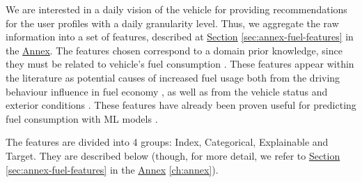 \begin{table}[h!]
\centering
{}
\caption{Sample of the received data from the telematics devices}
\label{table:ch6-sample-structure}
\end{table}

We are interested in a daily vision of the vehicle for providing recommendations for the user profiles with a daily granularity level. Thus, we aggregate the raw information into a set of features, described at \hyperref[sec:annex-fuel-features]{Section} \ref{sec:annex-fuel-features} in the \hyperref[ch:annex]{Annex}. The features chosen correspond to a domain prior knowledge, since they must be related to vehicle's fuel consumption \parencite{zacharof2016review}. These features appear within the literature as potential causes of increased fuel usage both from the driving behaviour influence in fuel economy \parencite{zhang2017safedrive}, as well as from the vehicle status and exterior conditions \parencite{zhou2016review}. These features have already been proven useful for predicting fuel consumption with ML models \parencite{9072728, 8727915, perrotta2017application, barbado2021understanding}.

The features are divided into 4 groups: Index, Categorical, Explainable and Target. They are described below (though, for more detail, we refer to \hyperref[sec:annex-fuel-features]{Section} \ref{sec:annex-fuel-features} in the \hyperref[ch:annex]{Annex} \ref{ch:annex}).

